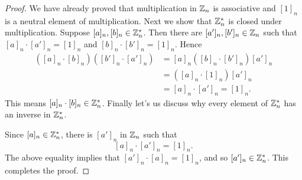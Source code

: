 \begin{proof}
    We have already proved that multiplication in $\mathbb{Z}_n$
    is associative and $[1]_n$ is a neutral element of multiplication.
    Next we show that $\mathbb{Z}_n^*$ is closed under multiplication.
    Suppose $[a]_n,[b]_n\in\mathbb{Z}_n^*$. Then there are 
    $[a']_n,[b']_n\in\mathbb{Z}_n$ such that $[a]_n\cdot [a']_n=[1]_n$
    and $[b]_n\cdot [b']_n=[1]_n$. Hence
    \[\begin{split}
        ([a]_n\cdot [b]_n)([b']_n\cdot [a']_n)
        &=[a]_n([b]_n\cdot [b']_n)[a']_n\\
        &=([a]_n\cdot [1]_n)[a']_n\\
        &=[a]_n\cdot [a']_n=[1]_n.
    \end{split}\]
    This means $[a]_n\cdot [b]_n\in\mathbb{Z}_n^*$. Finally let's us discuss
    why every element of $\mathbb{Z}_n^*$ has an inverse in $\mathbb{Z}_n^*$.

    Since $[a]_n\in\mathbb{Z}_n^*$, there is $[a']_n$ in $\mathbb{Z}_n$
    such that 
    \[[a]_n\cdot [a']_n=[1]_n.\]
    The above equality implies that $[a']_n\cdot [a]_n=[1]_n$,
    and so $[a']_n\in\mathbb{Z}_n^*$. This completes the proof.
\end{proof}